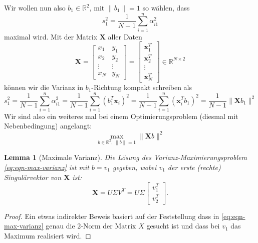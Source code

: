\documentclass[
]{book}
\newtheorem{lemma}{Lemma}[chapter]
\theoremstyle{definition}
\theoremstyle{definition}
\theoremstyle{definition}
\theoremstyle{definition}
\theoremstyle{remark}
\begin{document}
Wir wollen nun also \(b_1\in \mathbb R^{2}\), mit \(\|b_1\|=1\) so wählen, dass
\begin{equation*}
s_1^2 = \frac{1}{N-1}\sum_{i=1}^n \alpha_{i1}^2
\end{equation*}
maximal wird. Mit der Matrix \(\mathbf X\) aller Daten
\begin{equation*}
\mathbf X = \begin{bmatrix}
x_1 & y_1 \\ x_2 & y_2 \\ \vdots & \vdots \\ x_N & y_N
\end{bmatrix} = 
\begin{bmatrix}
\mathbf x_1^T\\ \mathbf x_2^T  \\  \vdots \\ \mathbf x_N^T
\end{bmatrix} 
\in \mathbb R^{N\times 2}
\end{equation*}
können wir die Varianz in \(b_1\)-Richtung kompakt schreiben als
\begin{equation*}
s_1^2 = \frac{1}{N-1}\sum_{i=1}^n \alpha_{i1}^2
= \frac{1}{N-1}\sum_{i=1}^n (b_1^T\mathbf x_i)^2
= \frac{1}{N-1}\sum_{i=1}^n (\mathbf x_i^Tb_1)^2
= \frac{1}{N-1}\| \mathbf X b_1 \|^2
\end{equation*}
Wir sind also ein weiteres mal bei einem Optimierungsproblem (diesmal mit Nebenbedingung) angelangt:
\begin{equation}\label{eq:eqn-max-varianz}
\max_{b\in \mathbb R^{2},\, \|b\|=1} \|\mathbf X b\|^2
\end{equation}

\begin{lemma}[Maximale Varianz]
\protect\hypertarget{lem:varianz-maximization}{}\label{lem:varianz-maximization}Die Lösung des Varianz-Maximierungsproblem \eqref{eq:eqn-max-varianz} ist mit \(b=v_1\) gegeben, wobei \(v_1\) der erste (rechte) Singulärvektor von \(\mathbf X\) ist:
\begin{equation*}
\mathbf X = U \Sigma V^T = U \Sigma \begin{bmatrix}
v_1^T \\ v_2^T
\end{bmatrix}.
\end{equation*}
\end{lemma}

\begin{proof}
Ein etwas indirekter Beweis basiert auf der Feststellung dass in
\eqref{eq:eqn-max-varianz} genau die 2-Norm der Matrix \(X\) gesucht ist und dass
bei \(v_1\) das Maximum realisiert wird.
\end{proof}
\end{document}
